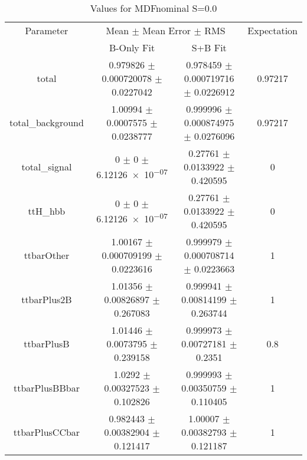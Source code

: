 \begin{table}
\centering
\caption{Values for MDFnominal S=0.0}
\begin{tabular}{cccc}
\toprule
Parameter & \multicolumn{2}{c}{Mean $\pm$ Mean Error $\pm$ RMS} & Expectation\\
 & B-Only Fit & S+B Fit & \\
\midrule
total & \num{0.979826} $\pm$ \num{0.000720078} $\pm$ \num{0.0227042} & \num{0.978459} $\pm$ \num{0.000719716} $\pm$ \num{0.0226912} & \num{0.97217}\\
total\_background & \num{1.00994} $\pm$ \num{0.0007575} $\pm$ \num{0.0238777} & \num{0.999996} $\pm$ \num{0.000874975} $\pm$ \num{0.0276096} & \num{0.97217}\\
total\_signal & \num{0} $\pm$ \num{0} $\pm$ \num{6.12126e-07} & \num{0.27761} $\pm$ \num{0.0133922} $\pm$ \num{0.420595} & \num{0}\\
ttH\_hbb & \num{0} $\pm$ \num{0} $\pm$ \num{6.12126e-07} & \num{0.27761} $\pm$ \num{0.0133922} $\pm$ \num{0.420595} & \num{0}\\
ttbarOther & \num{1.00167} $\pm$ \num{0.000709199} $\pm$ \num{0.0223616} & \num{0.999979} $\pm$ \num{0.000708714} $\pm$ \num{0.0223663} & \num{1}\\
ttbarPlus2B & \num{1.01356} $\pm$ \num{0.00826897} $\pm$ \num{0.267083} & \num{0.999941} $\pm$ \num{0.00814199} $\pm$ \num{0.263744} & \num{1}\\
ttbarPlusB & \num{1.01446} $\pm$ \num{0.0073795} $\pm$ \num{0.239158} & \num{0.999973} $\pm$ \num{0.00727181} $\pm$ \num{0.2351} & \num{0.8}\\
ttbarPlusBBbar & \num{1.0292} $\pm$ \num{0.00327523} $\pm$ \num{0.102826} & \num{0.999993} $\pm$ \num{0.00350759} $\pm$ \num{0.110405} & \num{1}\\
ttbarPlusCCbar & \num{0.982443} $\pm$ \num{0.00382904} $\pm$ \num{0.121417} & \num{1.00007} $\pm$ \num{0.00382793} $\pm$ \num{0.121187} & \num{1}\\
\bottomrule
\end{tabular}
\end{table}